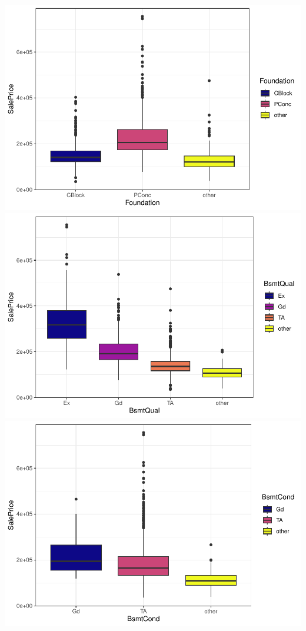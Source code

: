 \documentclass[
]{article}
\begin{document}
\includegraphics{report_files/figure-latex/categorical variables-16.pdf}
\includegraphics{report_files/figure-latex/categorical variables-17.pdf}
\includegraphics{report_files/figure-latex/categorical variables-18.pdf}
\end{document}
